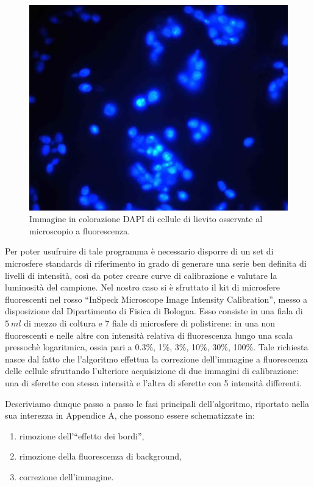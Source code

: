 \begin{figure}
 \centering
 \includegraphics[scale=.40]{img/CAP3bordi.jpg}
 \caption{\small{Immagine in colorazione DAPI di cellule di lievito osservate al microscopio a fluorescenza.}}
 \label{fig:bordi}
\end{figure}

Per poter usufruire di tale programma è necessario disporre di un set di microsfere standards di riferimento in grado di generare una serie ben definita di livelli di intensità, così da poter creare curve di calibrazione e valutare la luminosità del campione. 
Nel nostro caso si è sfruttato il kit di microsfere fluorescenti nel rosso ``InSpeck Microscope Image Intensity Calibration'', messo a disposizione dal Dipartimento di Fisica di Bologna. 
Esso consiste in una fiala di $5\ ml$ di mezzo di coltura e 7 fiale di microsfere di polistirene: in una non fluorescenti e nelle altre con intensità relativa di fluorescenza lungo una scala pressochè logaritmica, ossia pari a 0.3\%, 1\%, 3\%, 10\%, 30\%, 100\%.
Tale richiesta nasce dal fatto che l'algoritmo effettua la correzione dell'immagine a fluorescenza delle cellule sfruttando l'ulteriore acquisizione di due immagini di calibrazione: una di sferette con stessa intensità e l'altra di sferette con 5 intensità differenti.

Descriviamo dunque passo a passo le fasi principali dell'algoritmo, riportato nella sua interezza in Appendice A, che possono essere schematizzate in:
\begin{enumerate}
 \item rimozione dell'``effetto dei bordi'',
 \item rimozione della fluorescenza di background,
 \item correzione dell'immagine.
\end{enumerate}


